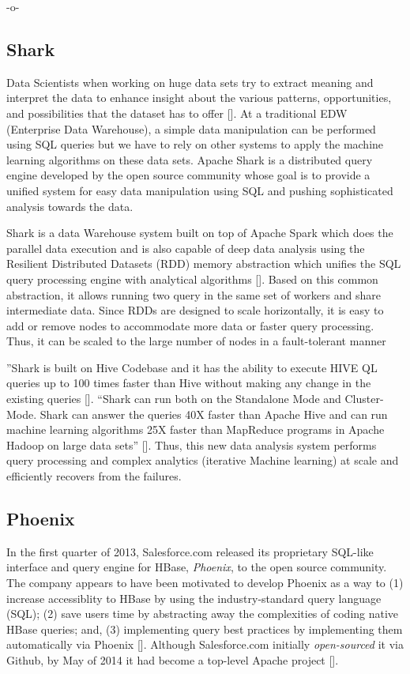      -o-
     

\subsection{Shark}

Data Scientists when working on huge data sets try to extract meaning
and interpret the data to enhance insight about the various patterns,
opportunities, and possibilities that the dataset has to
offer [\cite{shark-paper-2012}]. At a traditional EDW (Enterprise Data
Warehouse), a simple data manipulation can be performed using SQL
queries but we have to rely on other systems to apply the machine
learning algorithms on these data sets. Apache Shark is a distributed
query engine developed by the open source community whose goal is to
provide a unified system for easy data manipulation using SQL and
pushing sophisticated analysis towards the data.

Shark is a data Warehouse system built on top of Apache Spark which
does the parallel data execution and is also capable of deep data
analysis using the Resilient Distributed Datasets (RDD) memory
abstraction which unifies the SQL query processing engine with
analytical algorithms [\cite{shark-paper-2012}]. Based on this common
abstraction, it allows running two query in the same set of workers
and share intermediate data. Since RDDs are designed to scale
horizontally, it is easy to add or remove nodes to accommodate more
data or faster query processing. Thus, it can be scaled to the large
number of nodes in a fault-tolerant manner

''Shark is built on Hive Codebase and it has the ability to execute
HIVE QL queries up to 100 times faster than Hive without making any
change in the existing queries [\cite{shark-paper-2012}]. ``Shark can
run both on the Standalone Mode and Cluster-Mode. Shark can answer the
queries 40X faster than Apache Hive and can run machine learning
algorithms 25X faster than MapReduce programs in Apache Hadoop on
large data sets'' [\cite{shark-paper-2012}]. Thus, this new data
analysis system performs query processing and complex analytics
(iterative Machine learning) at scale and efficiently recovers from
the failures.

\subsection{Phoenix}

In the first quarter of 2013, Salesforce.com released its proprietary
SQL-like interface and query engine for HBase, \textit{Phoenix}, to the open
source community.  The company appears to have been motivated to
develop Phoenix as a way to (1) increase accessiblity to HBase by using
the industry-standard query language (SQL); (2) save users time by
abstracting away the complexities of coding native HBase queries; and,
(3) implementing query best practices by implementing them
automatically via Phoenix [\cite{www-phoenix-cloudera}]. Although
Salesforce.com initially \textit{open-sourced} it via Github, by May of 2014
it had become a top-level Apache project [\cite{www-phoenix-wikipedia}].

